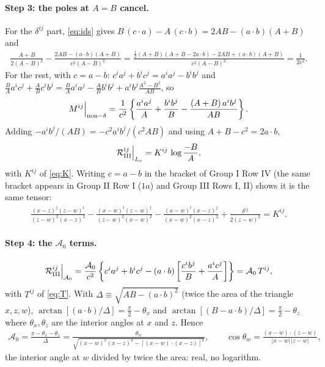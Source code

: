 \documentclass[10pt]{article}
\numberwithin{equation}{section}
\begin{document}
\paragraph{Step 3: the poles at $A=B$ cancel.} For the $\delta^{ij}$ part, \eqref{eq:ids} gives $B\,(c\cdot a)-A\,(c\cdot b)=2AB-(a\cdot b)(A+B)$ and
\begin{align}
\frac{A+B}{2(A-B)^{2}}-\frac{2AB-(a\cdot b)(A+B)}{c^{2}(A-B)^{2}}
=\frac{\tfrac12(A+B)(A+B-2a\cdot b)-2AB+(a\cdot b)(A+B)}{c^{2}(A-B)^{2}}
=\frac{1}{2c^{2}} .
\end{align}
For the rest, with $c=a-b$: $c^{i}a^{j}+b^{i}c^{j}=a^{i}a^{j}-b^{i}b^{j}$ and
$\frac{B}{A}a^{i}c^{j}+\frac{A}{B}c^{i}b^{j}=\frac{B}{A}a^{i}a^{j}-\frac{A}{B}b^{i}b^{j}+a^{i}b^{j}\frac{A^{2}-B^{2}}{AB}$, so
\begin{align}
M^{ij}\Big|_{{\rm non-}\delta}
=\frac{1}{c^{2}}\left\{\frac{a^{i}a^{j}}{A}+\frac{b^{i}b^{j}}{B}-\frac{(A+B)\,a^{i}b^{j}}{AB}\right\}.
\end{align}
Adding $-a^{i}b^{j}/(AB)=-c^{2}a^{i}b^{j}/(c^{2}AB)$ and using $A+B-c^{2}=2a\cdot b$,
\begin{align}
\mathcal{R}_{\rm III}^{ij}\Big|_{L_{c}}=K^{ij}\,\log\frac{-B}{A},
\end{align}
with $K^{ij}$ of \eqref{eq:K}. Writing $c=a-b$ in the bracket of Group I Row IV (the same bracket appears in Group II Row I ($1a$) and Group III Rows I, II) shows it is the same tensor:
\begin{align}
\frac{(x-z)^{j}(z-w)^{i}}{(z-w)^{2}(x-z)^{2}}-\frac{(x-w)^{i}(z-w)^{j}}{(z-w)^{2}(x-w)^{2}}-\frac{(x-w)^{i}(x-z)^{j}}{(x-w)^{2}(x-z)^{2}}+\frac{\delta^{ij}}{2(z-w)^{2}}=K^{ij}.
\end{align}

\paragraph{Step 4: the $\mathcal{A}_{0}$ terms.}
\begin{align}
\mathcal{R}_{\rm III}^{ij}\Big|_{\mathcal{A}_{0}}=\frac{\mathcal{A}_{0}}{c^{2}}\left\{c^{i}a^{j}+b^{i}c^{j}-(a\cdot b)\left[\frac{c^{i}b^{j}}{B}+\frac{a^{i}c^{j}}{A}\right]\right\}=\mathcal{A}_{0}\,T^{ij},
\end{align}
with $T^{ij}$ of \eqref{eq:T}. With $\Delta\equiv\sqrt{AB-(a\cdot b)^{2}}$ (twice the area of the triangle $x,z,w$), $\arctan[(a\cdot b)/\Delta]=\tfrac\pi2-\theta_{x}$ and $\arctan[(B-a\cdot b)/\Delta]=\tfrac\pi2-\theta_{z}$ where $\theta_{x},\theta_{z}$ are the interior angles at $x$ and $z$. Hence
\begin{align}
\mathcal{A}_{0}=\frac{\pi-\theta_{x}-\theta_{z}}{\Delta}=\frac{\theta_{w}}{\sqrt{(x-w)^{2}(x-z)^{2}-[(x-w)\cdot(x-z)]^{2}}},\qquad
\cos\theta_{w}=\frac{(x-w)\cdot(z-w)}{|x-w|\,|z-w|},
\end{align}
the interior angle at $w$ divided by twice the area: real, no logarithm.
\end{document}
